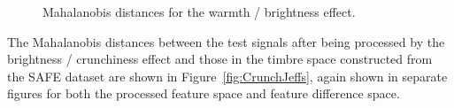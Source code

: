 			\begin{figure}[h!]
				\centering
				\quad
				\caption{Mahalanobis distances for the warmth / brightness effect.}
				\label{fig:HarshJeffs}
			\end{figure}

			The Mahalanobis distances between the test signals after being processed by the brightness /
			crunchiness effect and those in the timbre space constructed from the SAFE dataset are shown in
			Figure~\ref{fig:CrunchJeffs}, again shown in separate figures for both the processed feature space
			and feature difference space.


